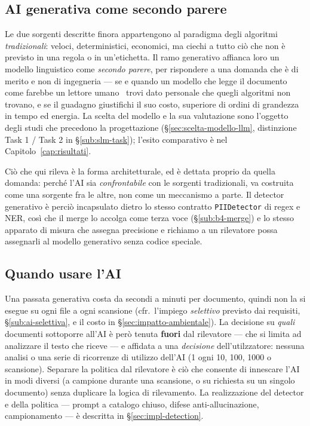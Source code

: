 \subsection{AI generativa come secondo parere}
\label{sub:b4-ai-previsto}

Le due sorgenti descritte finora appartengono al paradigma degli algoritmi \emph{tradizionali}: veloci, deterministici, economici, ma ciechi a tutto ciò che non è previsto in una regola o in un'etichetta. Il ramo generativo affianca loro un modello linguistico come \emph{secondo parere}, per rispondere a una domanda che è di merito e non di ingegneria --- se e quando un modello che legge il documento come farebbe un lettore umano~\cite{brownLanguageModelsAre2020} trovi dato personale che quegli algoritmi non trovano, e se il guadagno giustifichi il suo costo, superiore di ordini di grandezza in tempo ed energia. La scelta del modello e la sua valutazione sono l'oggetto degli studi che precedono la progettazione (§\ref{sec:scelta-modello-llm}, distinzione Task 1 / Task 2 in §\ref{sub:slm-task}); l'esito comparativo è nel Capitolo~\ref{cap:risultati}.

Ciò che qui rileva è la forma architetturale, ed è dettata proprio da quella domanda: perché l'AI sia \emph{confrontabile} con le sorgenti tradizionali, va costruita come una sorgente fra le altre, non come un meccanismo a parte. Il detector generativo è perciò incapsulato dietro lo stesso contratto \texttt{PIIDetector} di regex e NER, così che il merge lo accolga come terza voce (§\ref{sub:b4-merge}) e lo stesso apparato di misura che assegna precisione e richiamo a un rilevatore possa assegnarli al modello generativo senza codice speciale.

\subsection{Quando usare l'AI} Una passata generativa costa da secondi a minuti per documento, quindi non la si esegue su ogni file a ogni scansione (cfr.\ l'impiego \emph{selettivo} previsto dai requisiti, §\ref{sub:ai-selettiva}, e il costo in §\ref{sec:impatto-ambientale}). La decisione su \emph{quali} documenti sottoporre all'AI è però tenuta \textbf{fuori} dal rilevatore --- che si limita ad analizzare il testo che riceve --- e affidata a una \emph{decisione} dell'utilzzatore: nessuna analisi o una serie di ricorrenze di utilizzo dell'AI (1 ogni 10, 100, 1000 o scansione). Separare la politica dal rilevatore è ciò che consente di innescare l'AI in modi diversi (a campione durante una scansione, o su richiesta su un singolo documento) senza duplicare la logica di rilevamento. La realizzazione del detector e della politica --- prompt a catalogo chiuso, difese anti-allucinazione, campionamento --- è descritta in §\ref{sec:impl-detection}.

